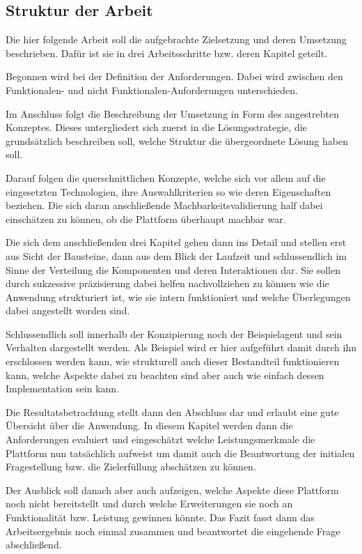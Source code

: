 \subsection{Struktur der Arbeit}

Die hier folgende Arbeit soll die aufgebrachte Zielsetzung und deren Umsetzung beschrieben.
Dafür ist sie in drei Arbeitsschritte bzw. deren Kapitel geteilt.

Begonnen wird bei der Definition der Anforderungen.
Dabei wird zwischen den Funktionalen- und nicht Funktionalen-Anforderungen unterschieden.

Im Anschluss folgt die Beschreibung der Umsetzung in Form des angestrebten Konzeptes.
Dieses untergliedert sich zuerst in die Lösungsstrategie, die grundsätzlich beschreiben soll, welche Struktur die übergeordnete Lösung haben soll.

Darauf folgen die querschnittlichen Konzepte, welche sich vor allem auf die eingesetzten Technologien, ihre Auswahlkriterien so wie deren Eigenschaften beziehen.
Die sich daran anschließende Machbarkeitsvalidierung half dabei einschätzen zu können, ob die Plattform überhaupt machbar war.

Die sich dem anschließenden drei Kapitel gehen dann ins Detail und stellen erst aus Sicht der Bausteine, dann aus dem Blick der Laufzeit und schlussendlich im Sinne der Verteilung die Komponenten und deren Interaktionen dar.
Sie sollen durch sukzessive präzisierung dabei helfen nachvollziehen zu können wie die Anwendung strukturiert ist, wie sie intern funktioniert und welche Überlegungen dabei angestellt worden sind.

Schlussendlich soll innerhalb der Konzipierung noch der Beispielagent und sein Verhalten dargestellt werden.
Als Beispiel wird er hier aufgeführt damit durch ihn erschlossen werden kann, wie strukturell auch dieser Bestandteil funktionieren kann, welche Aspekte dabei zu beachten sind aber auch wie einfach dessen Implementation sein kann.

Die Resultatsbetrachtung stellt dann den Abschluss dar und erlaubt eine gute Übersicht über die Anwendung.
In diesem Kapitel werden dann die Anforderungen evaluiert und eingeschätzt welche Leistungsmerkmale die Plattform nun tatsächlich aufweist um damit auch die Beantwortung der initialen Fragestellung bzw. die Zielerfüllung abschätzen zu können.

Der Ausblick soll danach aber auch aufzeigen, welche Aspekte diese Plattform noch nicht bereitstellt und durch welche Erweiterungen sie noch an Funktionalität bzw. Leistung gewinnen könnte.
Das Fazit fasst dann das Arbeitsergebnis noch einmal zusammen und beantwortet die eingehende Frage abschließend.
